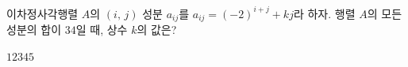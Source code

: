 \hspace*{2mm}\begin{minipage}[t]{\dimexpr\linewidth-2mm\relax}\vspace{0pt}
이차정사각행렬 $A$의 $(i,\,j)$ 성분 $a_{ij}$를 $a_{ij}=(-2)^{i+j}+kj$라 하자. 행렬 $A$의 모든 성분의 합이 $34$일 때, 상수 $k$의 값은?
\begin{choices32}{$1$}{$2$}{$3$}{$4$}{$5$}\end{choices32}\end{minipage}
